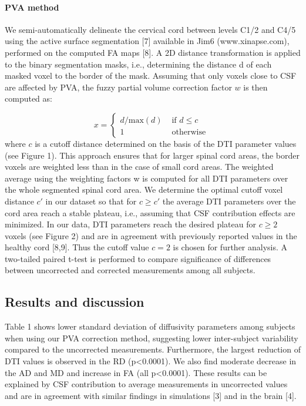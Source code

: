 \paragraph{PVA method}
We semi-automatically delineate the cervical cord between levels C1/2 and C4/5 using the active surface segmentation [7] available in Jim6 (www.xinapse.com), performed on the computed FA maps [8]. A 2D distance transformation is applied to the binary segmentation masks, i.e., determining the distance d of each masked voxel to the border of the mask. Assuming that only voxels close to CSF are affected by PVA, the fuzzy partial volume correction factor $w$ is then computed as: 

$$
x =\left\{\begin{array}{lll}
							d/\mbox{max}(d)&\mbox{ if } d\leq c\\
							1&\mbox{ otherwise }
		  \end{array}
   \right.
$$
where $c$ is a cutoff distance determined on the basis of the DTI parameter values (see Figure 1). This approach ensures that for larger spinal cord areas, the border voxels are weighted less than in the case of small cord areas. The weighted average using the weighting factors w is computed for all DTI parameters over the whole segmented spinal cord area. We determine the optimal cutoff voxel distance $c'$ in our dataset so that for $c\geq c'$ the average DTI parameters over the cord area reach a stable plateau, i.e., assuming that CSF contribution effects are minimized. In our data, DTI parameters reach the desired plateau for $c\geq 2$ voxels (see Figure 2) and are in agreement with previously reported values in the healthy cord [8,9]. Thus the cutoff value $c=2$ is chosen for further analysis. A two-tailed paired t-test is performed to compare significance of differences between uncorrected and corrected measurements among all subjects.
\subsection*{Results and discussion}
Table 1 shows lower standard deviation of diffusivity parameters among subjects when using our PVA correction method, suggesting lower inter-subject variability compared to the uncorrected measurements. Furthermore, the largest reduction of DTI values is observed in the RD (p<0.0001). We also find moderate decrease in the AD and MD and increase in FA (all p<0.0001). These results can be explained by CSF contribution to average measurements in uncorrected values and are in agreement with similar findings in simulations [3] and in the brain [4]. 
